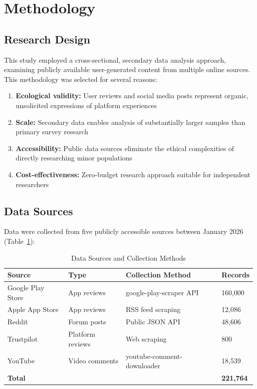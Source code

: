 \documentclass[12pt,a4paper]{article}
\begin{document}
\section{Methodology}

\subsection{Research Design}

This study employed a cross-sectional, secondary data analysis approach, examining publicly available user-generated content from multiple online sources. This methodology was selected for several reasons:

\begin{enumerate}[leftmargin=*, itemsep=0.3em]
    \item \textbf{Ecological validity:} User reviews and social media posts represent organic, unsolicited expressions of platform experiences
    \item \textbf{Scale:} Secondary data enables analysis of substantially larger samples than primary survey research
    \item \textbf{Accessibility:} Public data sources eliminate the ethical complexities of directly researching minor populations
    \item \textbf{Cost-effectiveness:} Zero-budget research approach suitable for independent researchers
\end{enumerate}

\subsection{Data Sources}

Data were collected from five publicly accessible sources between January 2026 (Table~\ref{tab:data_sources}):

\begin{table}[H]
\centering
\caption{Data Sources and Collection Methods}
\label{tab:data_sources}
\begin{tabular}{llll}
\toprule
\textbf{Source} & \textbf{Type} & \textbf{Collection Method} & \textbf{Records} \\
\midrule
Google Play Store & App reviews & google-play-scraper API & 160,000 \\
Apple App Store & App reviews & RSS feed scraping & 12,086 \\
Reddit & Forum posts & Public JSON API & 48,606 \\
Trustpilot & Platform reviews & Web scraping & 800 \\
YouTube & Video comments & youtube-comment-downloader & 18,539 \\
\midrule
\textbf{Total} & & & \textbf{221,764} \\
\bottomrule
\end{tabular}
\end{table}
\end{document}
